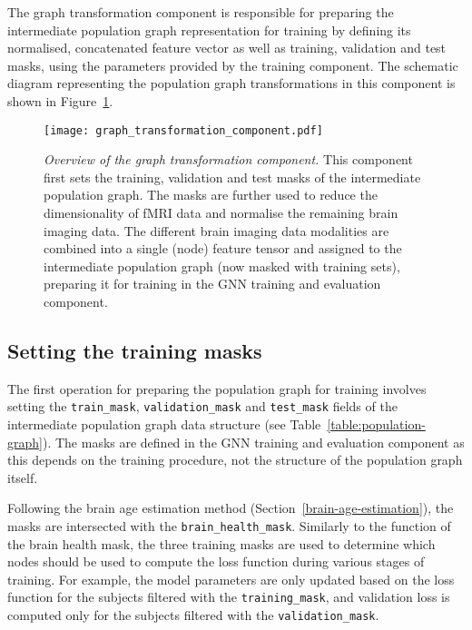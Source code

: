 The graph transformation component is responsible for preparing the intermediate population graph representation for training by defining its normalised, concatenated feature vector as well as training, validation and test masks, using the parameters provided by the training component. The schematic diagram representing the population graph transformations in this component is shown in Figure~\ref{graph-transformation-component}.

\begin{figure}[h]
    \centering
    \texttt{[image: graph\_transformation\_component.pdf]}
    \caption{\textit{Overview of the graph transformation component.}
    This component first sets the training, validation and test masks of the intermediate population graph. The masks are further used to reduce the dimensionality of fMRI data and normalise the remaining brain imaging data. The different brain imaging data modalities are combined into a single (node) feature tensor and assigned to the intermediate population graph (now masked with training sets), preparing it for training in the GNN training and evaluation component.
    }\label{graph-transformation-component}
\end{figure}

\subsection{Setting the training masks}
\label{setting-training-masks}
The first operation for preparing the population graph for training involves setting the \texttt{train\_mask}, \texttt{validation\_mask} and \texttt{test\_mask} fields of the intermediate population graph data structure (see Table~\ref{table:population-graph}). The masks are defined in the GNN training and evaluation component as this depends on the training procedure, not the structure of the population graph itself.

Following the brain age estimation method (Section~\ref{brain-age-estimation}), the masks are intersected with the \texttt{brain\_health\_mask}. Similarly to the function of the brain health mask, the three training masks are used to determine which nodes should be used to compute the loss function during various stages of training. For example, the model parameters are only updated based on the loss function for the subjects filtered with the \texttt{training\_mask}, and validation loss is computed only for the subjects filtered with the \texttt{validation\_mask}.


